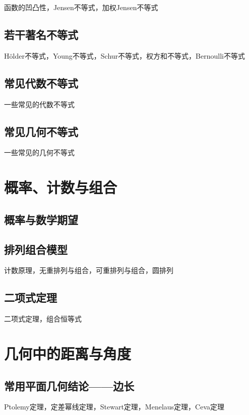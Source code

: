\documentclass[lang=cn, zihao=4.5]{elegantbook}
\begin{document}
函数的凹凸性，Jensen不等式，加权Jensen不等式

\section{若干著名不等式}

Hölder不等式，Young不等式，Schur不等式，权方和不等式，Bernoulli不等式

\section{常见代数不等式}

一些常见的代数不等式

\section{常见几何不等式}

一些常见的几何不等式

\chapter{概率、计数与组合}

\section{概率与数学期望}

\section{排列组合模型}

计数原理，无重排列与组合，可重排列与组合，圆排列

\section{二项式定理}

二项式定理，组合恒等式

\chapter{几何中的距离与角度}

\section{常用平面几何结论——边长}

Ptolemy定理，定差幂线定理，Stewart定理，Menelaus定理，Ceva定理
\end{document}
